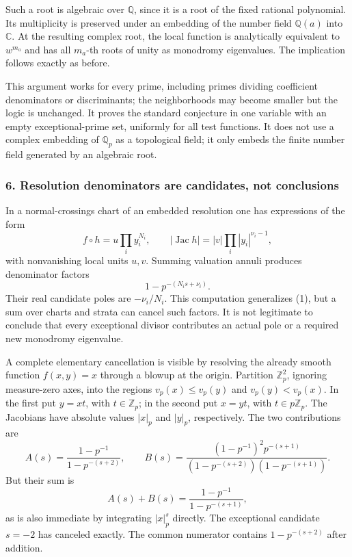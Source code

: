 \documentclass[11pt]{article}
\begin{document}
Such a root is algebraic over $\mathbb Q$, since it is a root of the fixed rational polynomial. Its multiplicity is preserved under an embedding of the number field $\mathbb Q(a)$ into $\mathbb C$. At the resulting complex root, the local function is analytically equivalent to $w^{m_a}$ and has all $m_a$-th roots of unity as monodromy eigenvalues. The implication follows exactly as before.

This argument works for every prime, including primes dividing coefficient denominators or discriminants; the neighborhoods may become smaller but the logic is unchanged. It proves the standard conjecture in one variable with an empty exceptional-prime set, uniformly for all test functions. It does not use a complex embedding of $\mathbb Q_p$ as a topological field; it only embeds the finite number field generated by an algebraic root.

\subsubsection{6. Resolution denominators are candidates, not conclusions}
In a normal-crossings chart of an embedded resolution one has expressions of the form
\[
 f\circ h=u\prod_i y_i^{N_i},\qquad
 |\operatorname{Jac}h|=|v|\prod_i|y_i|^{\nu_i-1},
\]
with nonvanishing local units $u,v$. Summing valuation annuli produces denominator factors
\[
 1-p^{-(N_i s+\nu_i)}.                                \tag{5}
\]
Their real candidate poles are $-\nu_i/N_i$. This computation generalizes (1), but a sum over charts and strata can cancel such factors. It is not legitimate to conclude that every exceptional divisor contributes an actual pole or a required new monodromy eigenvalue.

A complete elementary cancellation is visible by resolving the already smooth function $f(x,y)=x$ through a blowup at the origin. Partition $\mathbb Z_p^2$, ignoring measure-zero axes, into the regions $v_p(x)\le v_p(y)$ and $v_p(y)<v_p(x)$. In the first put $y=xt$, with $t\in\mathbb Z_p$; in the second put $x=yt$, with $t\in p\mathbb Z_p$. The Jacobians have absolute values $|x|_p$ and $|y|_p$, respectively. The two contributions are
\[
 A(s)=\frac{1-p^{-1}}{1-p^{-(s+2)}},\qquad
 B(s)=\frac{(1-p^{-1})^2p^{-(s+1)}}
             {(1-p^{-(s+2)})(1-p^{-(s+1)})}.
\]
But their sum is
\[
 A(s)+B(s)=\frac{1-p^{-1}}{1-p^{-(s+1)}},              \tag{6}
\]
as is also immediate by integrating $|x|_p^s$ directly. The exceptional candidate $s=-2$ has canceled exactly. The common numerator contains $1-p^{-(s+2)}$ after addition.
\end{document}
